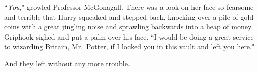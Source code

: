 ``\emph{You,}" growled Professor McGonagall. There was a look on her face so fearsome and terrible that Harry squeaked and stepped back, knocking over a pile of gold coins with a great jingling noise and sprawling backwards into a heap of money. Griphook sighed and put a palm over his face. ``I would be doing a great service to wizarding Britain, Mr.~Potter, if I locked you in this vault and left you here."

And they left without any more trouble.

